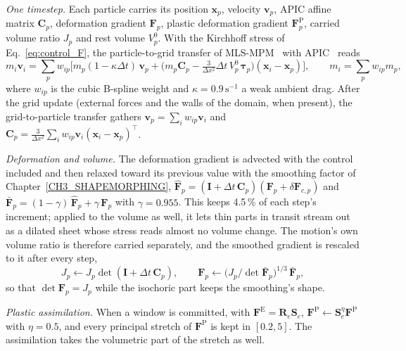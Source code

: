 \textit{One timestep.} Each particle carries its position $\mathbf{x}_p$, velocity $\mathbf{v}_p$, APIC affine matrix
$\mathbf{C}_p$, deformation gradient $\mathbf{F}_p$, plastic deformation gradient $\mathbf{F}^{\mathrm{P}}_p$, carried volume
ratio $J_p$ and rest volume $V^0_p$. With the Kirchhoff stress of Eq.~\eqref{eq:control_F}, the particle-to-grid transfer
of MLS-MPM~\citep{2018-MLSMPM} with APIC~\citep{2015-APIC} reads
\begin{equation}
\label{ch4:eq_p2g}
m_i\mathbf{v}_i=\sum_p w_{ip}\Big[m_p(1-\kappa\Delta t)\,\mathbf{v}_p
  +\Big(m_p\mathbf{C}_p-\tfrac{3}{\Delta x^{2}}\Delta t\,V^0_p\,\boldsymbol{\tau}_p\Big)(\mathbf{x}_i-\mathbf{x}_p)\Big],
\qquad m_i=\sum_p w_{ip}m_p ,
\end{equation}
where $w_{ip}$ is the cubic B-spline weight and $\kappa=0.9\,\mathrm{s}^{-1}$ a weak ambient drag. After the grid update
(external forces and the walls of the domain, when present), the grid-to-particle transfer gathers
$\mathbf{v}_p=\sum_i w_{ip}\mathbf{v}_i$ and $\mathbf{C}_p=\tfrac{3}{\Delta x^2}\sum_i w_{ip}\mathbf{v}_i(\mathbf{x}_i-\mathbf{x}_p)^{\top}$.

\textit{Deformation and volume.} The deformation gradient is advected with the control included and then relaxed toward
its previous value with the smoothing factor of Chapter~\ref{CH3_SHAPEMORPHING},
$\hat{\mathbf{F}}_p=(\mathbf{I}+\Delta t\,\mathbf{C}_p)(\mathbf{F}_p+\delta\mathbf{F}_{c,p})$ and
$\bar{\mathbf{F}}_p=(1-\gamma)\,\hat{\mathbf{F}}_p+\gamma\,\mathbf{F}_p$ with $\gamma=0.955$. This keeps 4.5\,\% of each step's
increment; applied to the volume as well, it lets thin parts in transit stream out as a dilated sheet whose stress reads
almost no volume change. The motion's own volume ratio is therefore carried separately, and the smoothed gradient is
rescaled to it after every step,
\begin{equation}
\label{ch4:eq_volume}
J_p\leftarrow J_p\det(\mathbf{I}+\Delta t\,\mathbf{C}_p),\qquad
\mathbf{F}_p\leftarrow\big(J_p/\det\bar{\mathbf{F}}_p\big)^{1/3}\,\bar{\mathbf{F}}_p ,
\end{equation}
so that $\det\mathbf{F}_p=J_p$ while the isochoric part keeps the smoothing's shape.

\textit{Plastic assimilation.} When a window is committed, with $\mathbf{F}^{\mathrm{E}}=\mathbf{R}_e\mathbf{S}_e$,
$\mathbf{F}^{\mathrm{P}}\leftarrow\mathbf{S}_e^{\eta}\mathbf{F}^{\mathrm{P}}$ with $\eta=0.5$, and every principal stretch of
$\mathbf{F}^{\mathrm{P}}$ is kept in $[0.2,5]$. The assimilation takes the volumetric part of the stretch as well.

